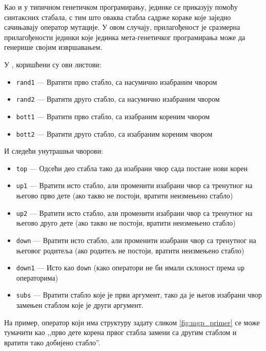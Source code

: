 \documentclass[a4paper]{article}
\begin{document}
Као и у типичном генетичком програмирању, јединке се приказују помоћу синтаксних стабала, с тим што оваква стабла садрже кораке које заједно сачињавају оператор мутације. У овом случају, прилагођеност је сразмерна прилагођености јединки које јединка мета-генетичког програмирања може да генерише својим извршавањем. 


У \cite{edmonds2001meta}, коришћени су ови листови:
\begin{itemize}
\item \texttt{rand1} — Вратити прво стабло, са насумично изабраним чвором
\item \texttt{rand2} — Вратити друго стабло, са насумично изабраним чвором
\item \texttt{bott1} — Вратити прво стабло, са изабраним кореним чвором
\item \texttt{bott2} — Вратити друго стабло, са изабраним кореним чвором
\end{itemize}

И следећи унутрашњи чворови:

\begin{itemize}
\item \texttt{top} — Одсећи део стабла тако да изабрани чвор сада постане нови корен
\item \texttt{up1} — Вратити исто стабло, али променити изабрани чвор са тренутног на његово прво дете (ако такво не постоји, вратити неизмењено стабло)
\item \texttt{up2} — Вратити исто стабло, али променити изабрани чвор са тренутног на његово друго дете (ако такво не постоји, вратити неизмењено стабло)
\item \texttt{down} — Вратити исто стабло, али променити изабрани чвор са тренутног на његовог родитеља (ако родитељ не постоји, вратити неизмењено стабло) 
\item \texttt{down1} — Исто као \texttt{down} (како оператори не би имали склоност према \texttt{up} операторима)
\item \texttt{subs} — Вратити стабло које је први аргумент, тако да је његов изабрани чвор замењен стаблом које је други аргумент.
\end{itemize}

На пример, оператор који има структуру задату сликом \ref{fig:mgp_primer} се може тумачити као ,,прво дете корена првог стабла замени са другим стаблом и вратити тако добијено стабло''.
\end{document}
